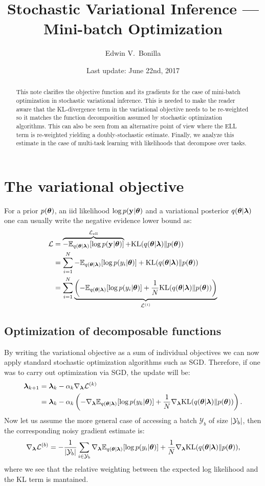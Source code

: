 \documentclass[11pt,a4paper]{article}
\title{Stochastic Variational Inference --- Mini-batch Optimization}
\author{Edwin V.~Bonilla}
\date{Last update: June 22nd, 2017}
\newcommand{\vectheta}{\vecS{\theta}}
\newcommand{\param}{\vecS{\lambda}}
\newcommand{\obs}{\vec{y}}
\newcommand{\slike}[1]{\log p(y_{#1}|\vectheta)}
\newcommand{\prior}{p(\vectheta)}
\newcommand{\like}[1]{\log p(\obs_{#1} | \vectheta)}
\newcommand{\post}{q(\vectheta | \param)}
\newcommand{\nelbo}{{\mathcal{L}}}
\newcommand{\ellterm}{{{\mathcal{L}}}_{\text{ell}}}
\newcommand{\singlenelbo}[1]{\nelbo^{(#1)}}
\newcommand{\stepsize}[1]{\alpha_{#1}}
\newcommand{\batch}[1]{{\mathcal{Y}}_{#1}}
\newcommand{\batchsize}[1]{\abs{\batch{#1}}}
\begin{document}
\maketitle
\begin{abstract}
This note clarifies the objective function and its gradients for the case of mini-batch optimization
in stochastic variational inference. This is needed to make the reader aware that the 
KL-divergence term in the variational objective needs to be re-weighted so it matches the 
function decomposition assumed by stochastic optimization algorithms.	This can also be seen from an alternative point of view where
the ELL term is re-weighted yielding a doubly-stochastic estimate. Finally, we analyze this estimate in the case of multi-task learning with  likelihoods that decompose over tasks. 
\end{abstract}

\section{The variational objective}
For a prior $\prior$, an iid likelihood $\like{}$ and a variational posterior 
$\post$ one can usually write the negative evidence lower bound as:
\begin{align}
\nelbo &=  \overbrace{ - \expectation{\post}{\like{}} }^{\ellterm} + \kl{\post}{\prior} \\
&= \sum_{i=1}^{N} - \expectation{\post}{\slike{i}} +  \kl{\post}{\prior}\\
&= \sum_{i=1}^{N}  \underbrace{\left(  - \expectation{\post}{\slike{i}}  + \frac{1}{N}\kl{\post}{\prior} \right)}_{\singlenelbo{i}}
\end{align}
%
\subsection{Optimization of decomposable functions}
By writing the variational objective as a sum of individual objectives we can now apply standard stochastic optimization algorithms such as SGD.
Therefore, if one was to carry out optimization via SGD, the update will be:
\begin{align}
\param_{k+1} &= \param_k - \stepsize{k} \grad_{\param}{\singlenelbo{k}} \\
&= \param_k - \stepsize{k} \left(- \grad_{\param}{\expectation{\post}{\slike{k}}} + \frac{1}{N} \grad_{\param} \kl{\post}{\prior} \right) \text{.}
\end{align}
Now let us assume the more general case of accessing a batch $\batch{b}$ of size $\batchsize{b}$, then
the corresponding noisy gradient estimate is:
\begin{align}
\label{eq:minibatch}
	\grad_{\param}\singlenelbo{b} = - \frac{1}{\batchsize{b}}\sum_{i \in \batch{b}} 
	 \grad_{\param} \expectation{\post}{\slike{i}} + \frac{1}{N}  \grad_{\param} \kl{\post}{\prior} \text{,}
\end{align}
where we see that the relative weighting between the expected log likelihood and the KL term is mantained. 
\end{document}
